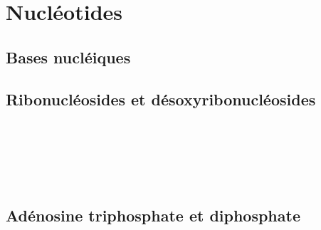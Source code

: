 \section{Nucléotides}

\subsection{Bases nucléiques}

\begin{boiteCodeTex}{}
   \hspace*{-20pt}
   \hspace*{-20pt}
\end{boiteCodeTex}

\subsection{Ribonucléosides et désoxyribonucléosides}

\begin{boiteCodeTex}{}
  \chemfig{!\adenosine}
  \chemfig{!\cytidine} 
  \chemfig{!\guanosine} \\[8pt]
  \chemfig{!\thymidine}
  \chemfig{!\uridine}  
\end{boiteCodeTex}

\begin{boiteCodeTex}{}
  \chemfig{!\adenosineHaw}
  \chemfig{!\cytidineHaw} 
  \chemfig{!\guanosineHaw} \\[8pt]
  \chemfig{!\thymidineHaw}
  \chemfig{!\uridineHaw}  
\end{boiteCodeTex}

\begin{boiteCodeTex}{}
  \chemfig{!\desoxyAdenosineHaw}
  \chemfig{!\desoxyCytidineHaw} 
  \chemfig{!\desoxyGuanosineHaw} \\[8pt]
  \chemfig{!\desoxyThymidineHaw}
  \chemfig{!\desoxyUridineHaw}  
\end{boiteCodeTex}

\subsection{Adénosine triphosphate et diphosphate}
\begin{boiteCodeTex}{}
  \chemfig{!\ADP}
  \chemfig{!\ATP}
\end{boiteCodeTex}

\begin{boiteCodeTex}{}
  \chemfig{!\ADPHaw}
  \chemfig{!\ATPHaw}
\end{boiteCodeTex}
